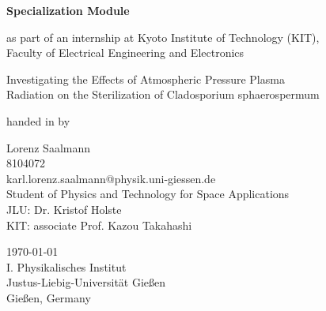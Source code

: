 {%
\pagestyle{empty}
\sffamily

\vspace{1cm}
\vfill
{\bfseries \Large Specialization Module}

{as part of an internship at Kyoto Institute of Technology (KIT),\\
Faculty of Electrical Engineering and Electronics}

\vspace{1cm}

{\Large Investigating the Effects of 
Atmospheric Pressure Plasma\\ Radiation 
on the Sterilization of Cladosporium sphaerospermum}
\vfill

handed in by

{\Large Lorenz Saalmann}\\[1.0ex]
{\large {8104072}}\\[.2ex]
{karl.lorenz.saalmann@physik.uni-giessen.de}\\[2ex]
{\large {Student of Physics and Technology for Space Applications}}\\[.5ex]


{\large {JLU:    Dr. Kristof Holste}}\\[.5ex]
{\large {KIT:    associate Prof. Kazou Takahashi}}\\[.5ex]


\vfill



{\large {\today}}\\[.5ex]

{\large {I. Physikalisches Institut}}\\[.5ex]
{\large {Justus-Liebig-Universität Gießen}}\\[.5ex]
{\large {Gießen, Germany}}\\[.5ex]

\cleardoublepage
}%